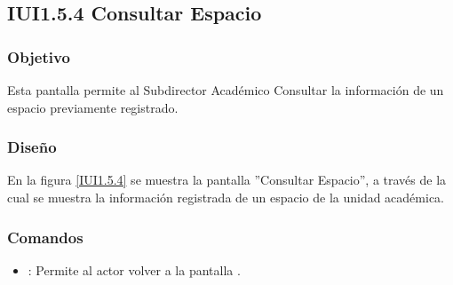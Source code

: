 \subsection{IUI1.5.4 Consultar Espacio}

\subsubsection{Objetivo}
	Esta pantalla permite al Subdirector Académico Consultar la información de un espacio previamente registrado.

\subsubsection{Diseño}

	En la figura \ref{IUI1.5.4} se muestra la pantalla ''Consultar Espacio'', a través de la cual se muestra la información registrada de un espacio de la unidad académica.


\subsubsection{Comandos}
\begin{itemize}
	
	\item {}: Permite al actor volver a la pantalla .
\end{itemize}
